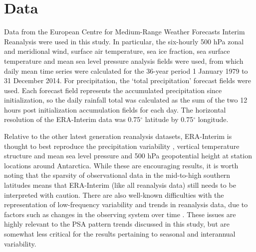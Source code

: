 \section{Data}

Data from the European Centre for Medium-Range Weather Forecasts Interim Reanalysis \citep[ERA-Interim;][]{Dee2011} were used in this study. In particular, the six-hourly 500 hPa zonal and meridional wind, surface air temperature, sea ice fraction, sea surface temperature and mean sea level pressure analysis fields were used, from which daily mean time series were calculated for the 36-year period 1 January 1979 to 31 December 2014. For precipitation, the `total precipitation' forecast fields were used. Each forecast field represents the accumulated precipitation since initialization, so the daily rainfall total was calculated as the sum of the two 12 hours post initialization accumulation fields for each day. The horizontal resolution of the ERA-Interim data was 0.75$^{\circ}$ latitude by 0.75$^{\circ}$ longitude.  

Relative to the other latest generation reanalysis datasets, ERA-Interim is thought to best reproduce the precipitation variability \citep{Bromwich2011,Nicolas2011}, vertical temperature structure \citep{Screen2012} and mean sea level pressure and 500 hPa geopotential height at station locations \citep{Bracegirdle2012} around Antarctica. While these are encouraging results, it is worth noting that the sparsity of observational data in the mid-to-high southern latitudes means that ERA-Interim (like all reanalysis data) still needs to be interpreted with caution. There are also well-known difficulties with the representation of low-frequency variability and trends in reanalysis data, due to factors such as changes in the observing system over time \citep{Dee2014}. These issues are highly relevant to the PSA pattern trends discussed in this study, but are somewhat less critical for the results pertaining to seasonal and interannual variability.

